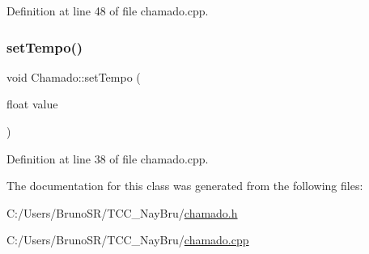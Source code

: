 Definition at line 48 of file chamado.\+cpp.

\hypertarget{class_chamado_a918eb6053797974911821b777695b0c2}{}\label{class_chamado_a918eb6053797974911821b777695b0c2} 
\subsubsection{\texorpdfstring{set\+Tempo()}{setTempo()}}
{\footnotesize\ttfamily void Chamado\+::set\+Tempo (\begin{DoxyParamCaption}\item[{float}]{value }\end{DoxyParamCaption})}



Definition at line 38 of file chamado.\+cpp.



The documentation for this class was generated from the following files\+:\begin{DoxyCompactItemize}
\item 
C\+:/\+Users/\+Bruno\+S\+R/\+T\+C\+C\+\_\+\+Nay\+Bru/\hyperlink{chamado_8h}{chamado.\+h}\item 
C\+:/\+Users/\+Bruno\+S\+R/\+T\+C\+C\+\_\+\+Nay\+Bru/\hyperlink{chamado_8cpp}{chamado.\+cpp}\end{DoxyCompactItemize}
